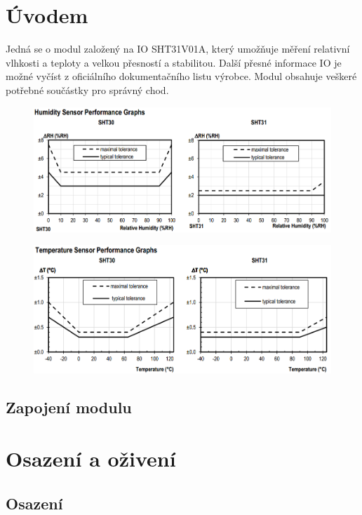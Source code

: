 \documentclass[12pt,a4paper,final,titlepage,twoside]{article}
\begin{document}



\section{Úvodem}
Jedná se o modul založený na IO SHT31V01A, který umožňuje měření relativní vlhkosti a teploty a velkou přesností a stabilitou. Další přesné informace IO je možné vyčíst z oficiálního dokumentačního listu výrobce. Modul obsahuje veškeré potřebné součástky pro správný chod.
\begin{figure}[h!]
\centering
\includegraphics[width=\textwidth]{SHPG.png}
\end{figure}
\begin{figure}[h!]
\centering
\includegraphics[width=\textwidth]{THPG.png}
\end{figure}


\hfill\subsection{Zapojení modulu}


\section{Osazení a oživení}
\subsection{Osazení}

\end{document}
